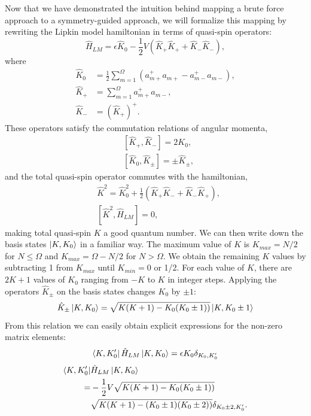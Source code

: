 \documentclass[prb,aps,twocolumn,showpacs,10pt]{revtex4-2}
\begin{document}
Now that we have demonstrated the intuition behind mapping a brute force approach to a symmetry-guided approach, we will formalize this mapping by rewriting the Lipkin model hamiltonian in terms of quasi-spin operators:
\begin{equation}
\hat{H}_{LM} = \epsilon \hat{K}_0 - \frac{1}{2} V (\hat{K}_+ \hat{K}_+ + \hat{K}_- \hat{K}_-),
\end{equation}
where
\begin{align}
\hat{K}_0 &= \frac{1}{2} \sum_{m=1}^\Omega (a_{m+}^+ a_{m+} - a_{m-}^+ a_{m-} ),\\
\hat{K}_+ &= \sum_{m=1}^\Omega a_{m+}^+ a_{m-}, \\
\hat{K}_- &= (\hat{K}_+)^+.
\end{align}
These operators satisfy the commutation relations of angular momenta,
\begin{align}
&[\hat{K}_+, \hat{K}_-] = 2 K_0,\\
&[\hat{K}_0, \hat{K}_\pm ] = \pm \hat{K}_\pm,
\end{align}
and the total quasi-spin operator commutes with the hamiltonian,
\begin{align}
&\hat{K}^2 = \hat{K}_0^2 + \frac{1}{2} ( \hat{K}_+ \hat{K}_- + \hat{K}_- \hat{K}_+ ),\\
&[\hat{K}^2, \hat{H}_{LM}]=0,
\end{align}
making total quasi-spin $K$ a good quantum number. We can then write down the basis states $\ket{K, K_0}$ in a familiar way. The maximum value of $K$ is $K_{max} = N/2$ for $N\leq \Omega$ and $K_{max} = \Omega-N/2$ for $N > \Omega$. We obtain the remaining $K$ values by subtracting 1 from $K_{max}$ until $K_{min}=0$ or 1/2. For each value of $K$, there are $2K+1$ values of $K_0$ ranging from $-K$ to $K$ in integer steps. Applying the operators $\hat{K}_\pm$ on the basis states changes $K_0$ by $\pm 1$:
\begin{equation}
\hat{K}_\pm \ket{K,K_0} = \sqrt{K(K+1) - K_0(K_0\pm 1))} \ket{K,K_0 \pm 1}
\end{equation}
From this relation we can easily obtain explicit expressions for the non-zero matrix elements:
\begin{equation}
\bra{K,K_0'} \hat{H}_{LM} \ket{K,K_0} = \epsilon K_0 \delta_{K_0, K_0'}
\end{equation}
\begin{align*}
\bra{K,K_0'} &\hat{H}_{LM}\ket{K,K_0} \\
=& - \frac{1}{2}V \sqrt{K(K+1) - K_0(K_0\pm 1))} \\
&\sqrt{K(K+1) - (K_0 \pm 1)(K_0\pm 2))} \delta_{K_0\pm 2, K_0'}.\\
\end{align*}
\end{document}
